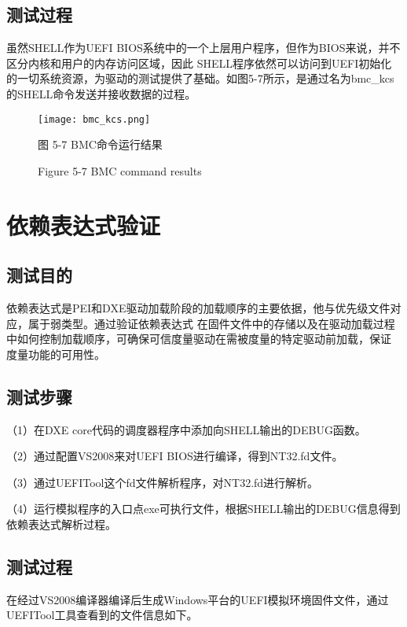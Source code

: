 \subsection{测试过程}
虽然SHELL作为UEFI BIOS系统中的一个上层用户程序，但作为BIOS来说，并不区分内核和用户的内存访问区域，因此
SHELL程序依然可以访问到UEFI初始化的一切系统资源，为驱动的测试提供了基础。如图5-7所示，是通过名为bmc\_kcs
的SHELL命令发送并接收数据的过程。

\begin{figure}[H]
    \vspace{0cm}   
    \setlength{\abovecaptionskip}{0.3cm}
	\centering
    \texttt{[image: bmc\_kcs.png]}
    \caption*{图 5-7 BMC命令运行结果}
    \setlength{\belowcaptionskip}{-0.7cm}
    \caption*{Figure 5-7 BMC command results}
\end{figure}

%
%
\section{依赖表达式验证}

\subsection{测试目的}
依赖表达式是PEI和DXE驱动加载阶段的加载顺序的主要依据，他与优先级文件对应，属于弱类型。通过验证依赖表达式
在固件文件中的存储以及在驱动加载过程中如何控制加载顺序，可确保可信度量驱动在需被度量的特定驱动前加载，保证
度量功能的可用性。

\subsection{测试步骤}
（1）在DXE core代码的调度器程序中添加向SHELL输出的DEBUG函数。
\par （2）通过配置VS2008来对UEFI BIOS进行编译，得到NT32.fd文件。
\par （3）通过UEFITool这个fd文件解析程序，对NT32.fd进行解析。
\par （4）运行模拟程序的入口点exe可执行文件，根据SHELL输出的DEBUG信息得到依赖表达式解析过程。

\subsection{测试过程}
在经过VS2008编译器编译后生成Windows平台的UEFI模拟环境固件文件，通过UEFITool工具查看到的文件信息如下。

